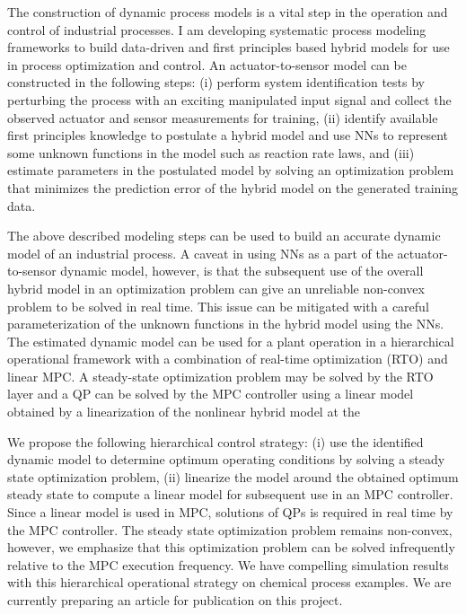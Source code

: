 \documentclass[11pt, a4paper]{article} %
\begin{document}
The construction of dynamic process models is a vital step in the operation and 
control of industrial processes. I am developing systematic process modeling 
frameworks to build data-driven and first principles based hybrid
models for use in process optimization and control. An actuator-to-sensor 
model can be constructed in the following steps: (i) perform system 
identification tests by perturbing the process with an exciting manipulated 
input signal and collect the observed actuator and sensor measurements for 
training, (ii) identify available first principles knowledge to postulate a 
hybrid model and use NNs to represent some unknown functions in the model such 
as reaction rate laws, and (iii) estimate parameters in the postulated model by 
solving an optimization problem that minimizes the prediction error of the 
hybrid model on the generated training data.

The above described modeling steps can be used to build an accurate dynamic 
model of an industrial process. A caveat in using NNs as a part of the 
actuator-to-sensor dynamic model, however, is that the subsequent use of the 
overall hybrid model in an optimization problem can give an unreliable 
non-convex problem to be solved in real time. This issue can be mitigated 
with a careful parameterization of the unknown functions in the hybrid model 
using the NNs. The estimated dynamic model can be used for a plant operation in 
a hierarchical operational framework with a combination of real-time 
optimization (RTO) and linear MPC. A steady-state optimization problem may be 
solved by the RTO layer and a QP can be solved by the MPC controller using a 
linear model obtained by a linearization of the nonlinear hybrid model at the 

We propose the following hierarchical 
control strategy: (i) use the identified dynamic model to determine optimum 
operating conditions by solving a steady state optimization problem, (ii) 
linearize the model around the obtained optimum steady state to compute a 
linear model for subsequent use in an MPC controller. Since a linear model is 
used in  MPC, solutions of QPs is required in real time by the MPC controller. 
The steady state optimization problem remains non-convex, however, we emphasize 
that this optimization problem can be solved infrequently relative to the MPC 
execution frequency. We have compelling simulation results with this 
hierarchical operational strategy on chemical process examples. We are 
currently preparing an article for publication on this project.
\end{document}
